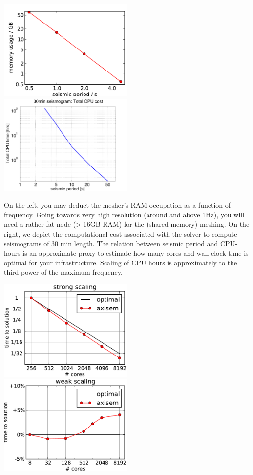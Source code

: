 \documentclass{article}
\begin{document}
\begin{center}
    \includegraphics[height=50mm]{memory_usage_new.pdf}
    \hspace{5mm}
    \includegraphics[height=50mm]{solver_totalcpu.pdf}
\end{center}

On the left, you may deduct the mesher's RAM occupation as a function of frequency. Going
towards very high resolution (around and above 1Hz), you will need a rather fat node (>
16GB RAM) for the (shared memory) meshing.
On the right, we depict the computational cost
associated with the solver to compute seismograms of 30 min length. The relation between
seismic period and CPU-hours is an approximate proxy to estimate how many cores and
wall-clock time is optimal for your infrastructure. Scaling of CPU hours is approximately 
to the third power of the maximum frequency.

\begin{center}
    \includegraphics[height=50mm]{COMPUTATIONAL_COST/strong_scaling_new.pdf}
    \hspace{5mm}
    \includegraphics[height=50mm]{COMPUTATIONAL_COST/weak_scaling_new.pdf}
\end{center}
\end{document}
